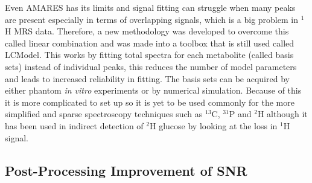 \documentclass[class=article, crop=false]{standalone}
\begin{document}
Even AMARES has its limits and signal fitting can struggle when many peaks are present especially in terms of overlapping signals, which is a big problem in $^1$H MRS data. Therefore, a new methodology was developed to overcome this called linear combination and was made into a toolbox that is still used called LCModel\cite{Provencher1993EstimationSpectra}. This works by fitting total spectra for each metabolite (called basis sets) instead of individual peaks, this reduces the number of model parameters and leads to increased reliability in fitting. The basis sets can be acquired by either phantom \textit{in vitro} experiments or by numerical simulation\cite{Near2021PreprocessingRecommendations}. Because of this it is more complicated to set up so it is yet to be used commonly for the more simplified and sparse spectroscopy techniques such as $^{13}$C, $^{31}$P and $^2$H although it has been used in indirect detection of $^2$H glucose by looking at the loss in $^1$H signal\cite{Rich20201HVivo,Cember2022IntegratingHumans,Niess2023Reproducibility3T}. 

\subsection{Post-Processing Improvement of SNR}
\end{document}
